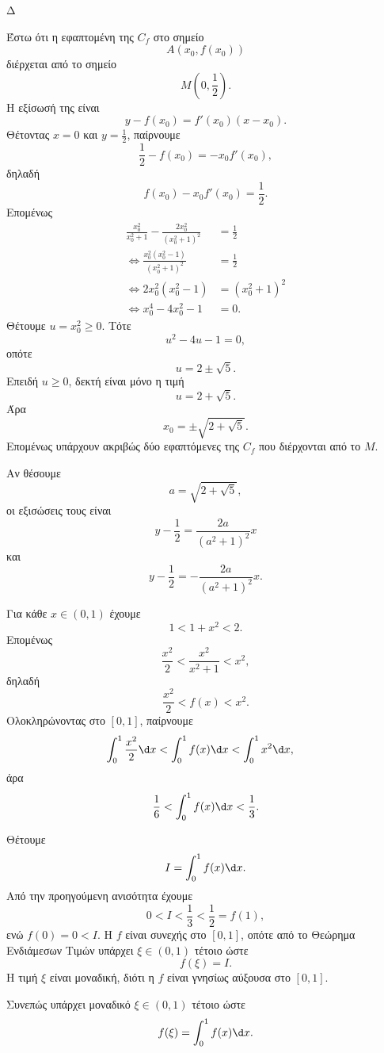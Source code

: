 \begin{thema}{Δ}
\begin{erwthma}
\item Έστω ότι η εφαπτομένη της $C_f$ στο σημείο
\[
A\left(x_0,f(x_0)\right)
\]
διέρχεται από το σημείο
\[
M\left(0,\frac12\right).
\]
Η εξίσωσή της είναι
\[
y-f(x_0)=f'(x_0)(x-x_0).
\]
Θέτοντας $x=0$ και $y=\frac12$, παίρνουμε
\[
\frac12-f(x_0)=-x_0f'(x_0),
\]
δηλαδή
\[
f(x_0)-x_0f'(x_0)=\frac12.
\]
Επομένως
\begin{align*}
\frac{x_0^2}{x_0^2+1}
-\frac{2x_0^2}{(x_0^2+1)^2}
&=\frac12\\
\Leftrightarrow
\frac{x_0^2(x_0^2-1)}
{(x_0^2+1)^2}
&=\frac12\\
\Leftrightarrow
2x_0^2(x_0^2-1)
&=(x_0^2+1)^2\\
\Leftrightarrow
x_0^4-4x_0^2-1&=0.
\end{align*}
Θέτουμε $u=x_0^2\geq0$. Τότε
\[
u^2-4u-1=0,
\]
οπότε
\[
u=2\pm\sqrt5.
\]
Επειδή $u\geq0$, δεκτή είναι μόνο η τιμή
\[
u=2+\sqrt5.
\]
Άρα
\[
{x_0=\pm\sqrt{2+\sqrt5}}.
\]
Επομένως υπάρχουν ακριβώς δύο εφαπτόμενες της $C_f$ που διέρχονται από το $M$.

Αν θέσουμε
\[
a=\sqrt{2+\sqrt5},
\]
οι εξισώσεις τους είναι
\[
{
y-\frac12
=\frac{2a}{(a^2+1)^2}x}
\]
και
\[
{
y-\frac12
=-\frac{2a}{(a^2+1)^2}x}.
\]

\item Για κάθε $x\in(0,1)$ έχουμε
\[
1<1+x^2<2.
\]
Επομένως
\[
\frac{x^2}{2}
<\frac{x^2}{x^2+1}
<x^2,
\]
δηλαδή
\[
\frac{x^2}{2}<f(x)<x^2.
\]
Ολοκληρώνοντας στο $[0,1]$, παίρνουμε
\begin{align*}
\int_0^1\frac{x^2}{2}\d x
&<\int_0^1f(x)\d x
<\int_0^1x^2\d x,
\end{align*}
άρα
\[
{
\frac16<\int_0^1f(x)\d x<\frac13}.
\]

Θέτουμε
\[
I=\int_0^1f(x)\d x.
\]
Από την προηγούμενη ανισότητα έχουμε
\[
0<I<\frac13<\frac12=f(1),
\]
ενώ $f(0)=0<I$. Η $f$ είναι συνεχής στο $[0,1]$, οπότε από το Θεώρημα Ενδιάμεσων Τιμών υπάρχει $\xi\in(0,1)$ τέτοιο ώστε
\[
f(\xi)=I.
\]
Η τιμή $\xi$ είναι μοναδική, διότι η $f$ είναι γνησίως αύξουσα στο $[0,1]$.

Συνεπώς υπάρχει μοναδικό $\xi\in(0,1)$ τέτοιο ώστε
\[
{f(\xi)=\int_0^1f(x)\d x}.
\]
\end{erwthma}
\end{thema}

